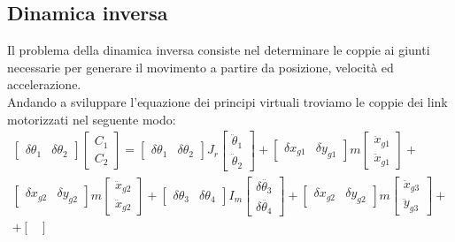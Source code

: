 \subsection{Dinamica inversa}
Il problema della dinamica inversa consiste nel determinare le coppie ai giunti necessarie per generare il movimento a partire da posizione, velocità ed accelerazione.
\\Andando a sviluppare l'equazione dei principi virtuali troviamo le coppie dei link motorizzati nel seguente modo:
\begin{equation}
\begin{split}
\begin{bmatrix}
\delta \theta_1 & \delta \theta_2
\end{bmatrix}
\begin{bmatrix}
C_1 \\ C_2
\end{bmatrix} 
= \begin{bmatrix}
\delta \theta_1 & \delta \theta_2
\end{bmatrix} J_r \begin{bmatrix}
\ddot{\theta}_1 \\ \ddot{\theta}_2
\end{bmatrix}+ \begin{bmatrix}
\delta x_{g1} & \delta y_{g1}
\end{bmatrix}m\begin{bmatrix}
\ddot{x}_{g1} \\ \ddot{x}_{g1}
\end{bmatrix} +
\\ \begin{bmatrix} \delta x_{g2} & \delta y_{g2}
\end{bmatrix}m\begin{bmatrix}
\ddot{x}_{g2} \\ \ddot{x}_{g2}
\end{bmatrix} +
\begin{bmatrix}
\delta \theta_3 & \delta \theta_4
\end{bmatrix}I_m \begin{bmatrix}
\delta \ddot{\theta_3} \\ \delta\ddot{\theta_4}
\end{bmatrix}+\begin{bmatrix}
\delta x_{g2} & \delta y_{g2}
\end{bmatrix} m \begin{bmatrix}
\ddot{x}_{g3} \\ \ddot{y}_{g3}
\end{bmatrix}+\\+\begin{bmatrix}

\end{bmatrix}
\end{split}
\end{equation}
